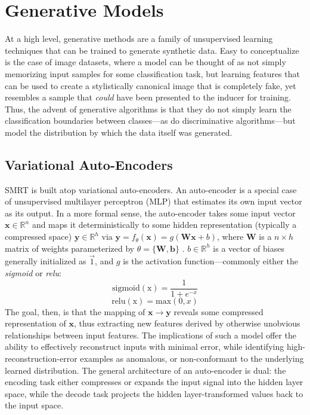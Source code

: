 \documentclass[twoside,11pt]{article}
\begin{document}
\section{Generative Models}

At a high level, generative methods are a family of unsupervised learning techniques that can be trained to generate synthetic data. Easy to conceptualize is the case of image datasets, where a model can be thought of as not simply memorizing input samples for some classification task, but learning features that can be used to create a stylistically canonical image that is completely fake, yet resembles a sample that \emph{could} have been presented to the inducer for training. Thus, the advent of generative algorithms is that they do not simply learn the classification boundaries between classes---as do discriminative algorithms---but model the distribution by which the data itself was generated.

\subsection{Variational Auto-Encoders}

SMRT is built atop variational auto-encoders. An auto-encoder is a special case of unsupervised multilayer perceptron (MLP) that estimates its own input vector as its output. In a more formal sense, the auto-encoder takes some input vector $\mathbf{x} \in  \mathbb{R}^{n}$ and maps it deterministically to some hidden representation (typically a compressed space) $\mathbf{y} \in  \mathbb{R}^{h}$ via $\mathbf{y} = f_{\theta}(\mathbf{x}) = g(\mathbf{Wx} + b)$, where $\mathbf{W}$ is a $n \times h$ matrix of weights parameterized by $\theta = \{\mathbf{W, b}\}$ \citep{meyer2015introduction}. $b \in \mathbb{R}^{h}$ is a vector of biases generally initialized as $\vec{1}$, and $g$ is the activation function---commonly either the \emph{sigmoid} or \emph{relu}:
\[
    \mathrm{sigmoid(x)} = \frac{1}{1 + e^{-x}}
\]
\[
    \mathrm{relu(x)} = \mathrm{max}(0,x)
\]
The goal, then, is that the mapping of $\mathbf{x} \rightarrow \mathbf{y}$ reveals some compressed representation of $\mathbf{x}$, thus extracting new features derived by otherwise unobvious relationships between input features. The implications of such a model offer the ability to effectively reconstruct inputs with minimal error, while identifying high-reconstruction-error examples as anomalous, or non-conformant to the underlying learned distribution. The general architecture of an auto-encoder is dual: the encoding task either compresses or expands the input signal into the hidden layer space, while the decode task projects the hidden layer-transformed values back to the input space.
\end{document}
